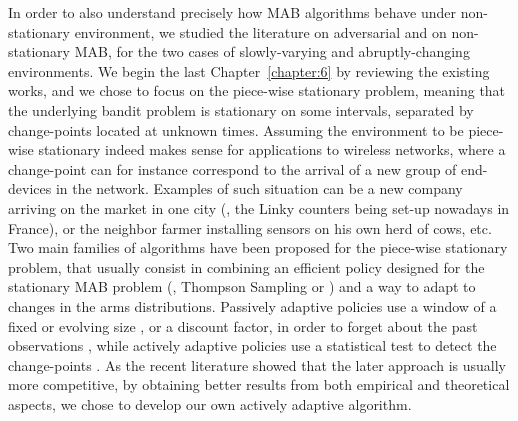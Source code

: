 %
In order to also understand precisely how MAB algorithms behave under non-stationary environment, we studied the literature on adversarial and on non-stationary MAB, for the two cases of slowly-varying and abruptly-changing environments.
We begin the last Chapter~\ref{chapter:6} by reviewing the existing works,
and we chose to focus on the piece-wise stationary problem,
meaning that the underlying bandit problem is stationary on some intervals, separated by change-points located at unknown times.
Assuming the environment to be piece-wise stationary indeed makes sense for applications to wireless networks, where a change-point can for instance correspond to the arrival of a new group of end-devices in the network. Examples of such situation can be a new company arriving on the market in one city (\eg, the Linky counters being set-up nowadays in France), or the neighbor farmer installing sensors on his own herd of cows, etc.
%
Two main families of algorithms have been proposed for the piece-wise stationary problem,
that usually consist in combining an efficient policy designed for the stationary MAB problem (\eg, Thompson Sampling or \klUCB) and a way to adapt to changes in the arms distributions.
Passively adaptive policies use a window of a fixed or evolving size \cite{Garivier11UCBDiscount}, or a discount factor, in order to forget about the past observations \cite{Kocsis06,Gupta11thompson},
while actively adaptive policies use a statistical test to detect the change-points \cite{MellorShapiro13,Allesiardo15}.
%
As the recent literature showed that the later approach is usually more competitive, by obtaining better results from both empirical and theoretical aspects, we chose to develop our own actively adaptive algorithm.

